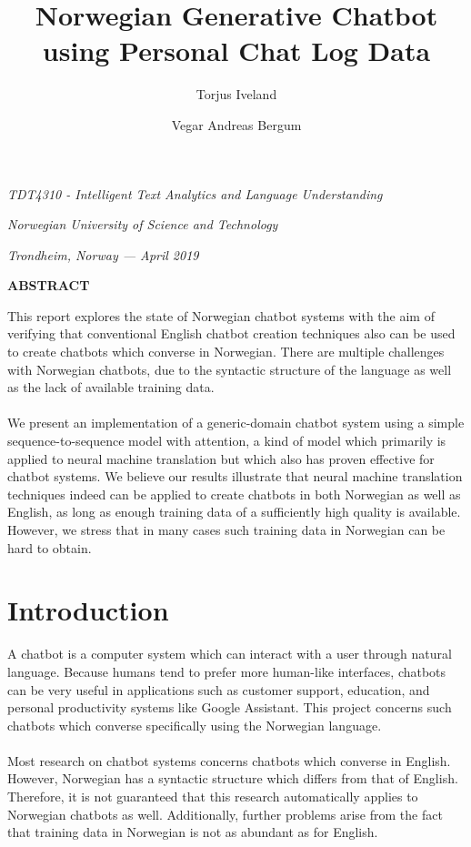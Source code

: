 \documentclass{article}
\title{\textbf{Norwegian Generative Chatbot using Personal Chat Log Data}}
\author{Torjus Iveland \and Vegar Andreas Bergum}
\date{}
\renewcommand\abstractname{ABSTRACT}
\renewenvironment{abstract}
 {\small
  \begin{center}
  \bfseries \abstractname\vspace{0em}
  \end{center}
  \list{}{
    \setlength{\leftmargin}{12.5mm}%
    \setlength{\rightmargin}{\leftmargin}%
  }
  \item\relax}
 {\endlist}
\begin{document}
\maketitle
\centerline{\textit{TDT4310 - Intelligent Text Analytics and Language
Understanding}}
\centerline{\textit{Norwegian University of Science and Technology}}
\centerline{\textit{Trondheim, Norway --- April 2019}}
\vspace{6mm} %

\begin{abstract}

This report explores the state of Norwegian chatbot systems with
the aim of verifying that conventional English chatbot creation techniques
also can be used to create chatbots which converse in Norwegian. There are
multiple challenges with Norwegian chatbots, due to the syntactic structure
of the language as well as the lack of available training data.

\paragraph{}
We present an implementation of a generic-domain chatbot system using a simple
sequence-to-sequence model with attention, a kind of model which primarily is
applied to neural machine translation but which also has proven effective for
chatbot systems. We believe our results illustrate that neural machine
translation techniques indeed can be applied to create chatbots in both
Norwegian as well as English, as long as enough training data of a
sufficiently high quality is available. However, we stress that in many cases
such training data in Norwegian can be hard to obtain.  

\end{abstract}

\vspace{3mm}

\section*{Introduction}
A chatbot is a computer system which can interact with a user through natural
language. Because humans tend to prefer more human-like interfaces, chatbots
can be very useful in applications such as customer support, education, and
personal productivity systems like Google Assistant. This project concerns
such chatbots which converse specifically using the Norwegian language.

\paragraph{}
Most research on chatbot systems concerns chatbots which converse in English.
However, Norwegian has a syntactic structure which differs from that of
English. Therefore, it is not guaranteed that this research automatically
applies to Norwegian chatbots as well. Additionally, further problems arise
from the fact that training data in Norwegian is not as abundant as for
English.
\end{document}
